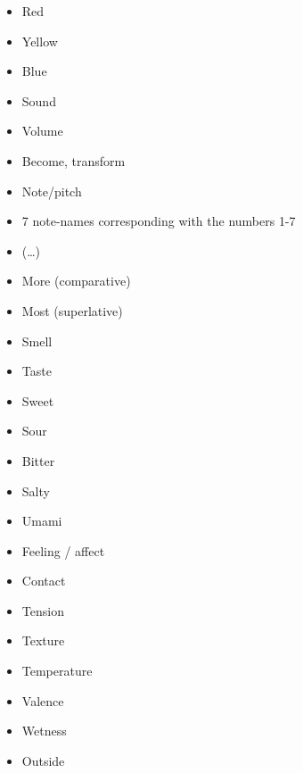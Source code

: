 \begin{multicols}{2}
\begin{itemize}
\item   Red 

\item   Yellow 

\item   Blue 

\item   Sound 

\item   Volume 

\item   Become, transform 

\item   Note/pitch 

\item   7 note-names corresponding with the numbers 1-7 

\item   (…) 

\item   More (comparative)  

\item   Most (superlative) 

\item   Smell 

\item   Taste 

\item   Sweet 

\item   Sour 

\item   Bitter 

\item   Salty 

\item   Umami 

\item   Feeling / affect 

\item   Contact 

\item   Tension 

\item   Texture 

\item   Temperature 

\item   Valence 

\item   Wetness 

\item   Outside 


\end{itemize}
\end{multicols}

